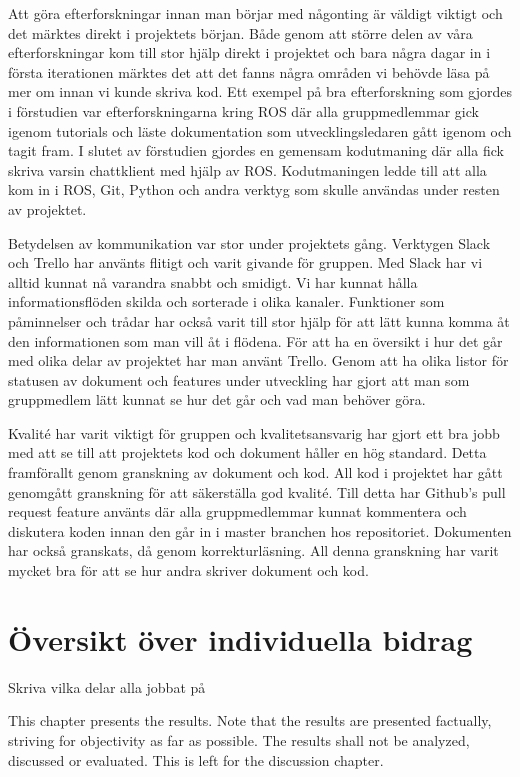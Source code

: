 Att göra efterforskningar innan man börjar med någonting är väldigt viktigt och det märktes direkt i projektets början. Både genom att större delen av våra efterforskningar kom till stor hjälp direkt i projektet och bara några dagar in i första iterationen märktes det att det fanns några områden vi behövde läsa på mer om innan vi kunde skriva kod. Ett exempel på bra efterforskning som gjordes i förstudien var efterforskningarna kring ROS där alla gruppmedlemmar gick igenom tutorials och läste dokumentation som utvecklingsledaren gått igenom och tagit fram. I slutet av förstudien gjordes en gemensam kodutmaning där alla fick skriva varsin chattklient med hjälp av ROS. Kodutmaningen ledde till att alla kom in i ROS, Git, Python och andra verktyg som skulle användas under resten av projektet.

Betydelsen av kommunikation var stor under projektets gång. Verktygen Slack och Trello har använts flitigt och varit givande för gruppen. Med Slack har vi alltid kunnat nå varandra snabbt och smidigt. Vi har kunnat hålla informationsflöden skilda och sorterade i olika kanaler. Funktioner som påminnelser och trådar har också varit till stor hjälp för att lätt kunna komma åt den informationen som man vill åt i flödena. För att ha en översikt i hur det går med olika delar av projektet har man använt Trello. Genom att ha olika listor för statusen av dokument och features under utveckling har gjort att man som gruppmedlem lätt kunnat se hur det går och vad man behöver göra. 

Kvalité har varit viktigt för gruppen och kvalitetsansvarig har gjort ett bra jobb med att se till att projektets kod och dokument håller en hög standard. Detta framförallt genom granskning av dokument och kod. All kod i projektet har gått genomgått granskning för att säkerställa god kvalité. Till detta har Github's pull request feature använts där alla gruppmedlemmar kunnat kommentera och diskutera koden innan den går in i master branchen hos repositoriet. Dokumenten har också granskats, då genom korrekturläsning. All denna granskning har varit mycket bra för att se hur andra skriver dokument och kod.  

\section{Översikt över individuella bidrag}

Skriva vilka delar alla jobbat på

This chapter presents the results. Note that the results are presented
factually, striving for objectivity as far as possible.  The results
shall not be analyzed, discussed or evaluated.  This is left for the
discussion chapter.


